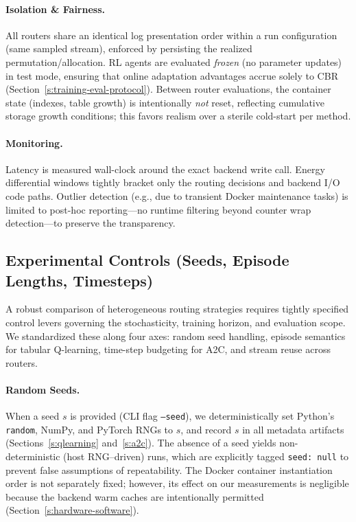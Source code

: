 \paragraph{Isolation \& Fairness.} All routers share an identical log presentation order within a run configuration (same sampled stream), enforced by persisting the realized permutation/allocation. RL agents are evaluated \emph{frozen} (no parameter updates) in test mode, ensuring that online adaptation advantages accrue solely to CBR (Section~\ref{s:training-eval-protocol}). Between router evaluations, the container state (indexes, table growth) is intentionally \emph{not} reset, reflecting cumulative storage growth conditions; this favors realism over a sterile cold-start per method.

\paragraph{Monitoring.} Latency is measured wall-clock around the exact backend write call. Energy differential windows tightly bracket only the routing decisions and backend I/O code paths. Outlier detection (e.g., due to transient Docker maintenance tasks) is limited to post-hoc reporting—no runtime filtering beyond counter wrap detection—to preserve the transparency.



\subsection{Experimental Controls (Seeds, Episode Lengths, Timesteps)}
\label{s:experimental-controls}

A robust comparison of heterogeneous routing strategies requires tightly specified control levers governing the stochasticity, training horizon, and evaluation scope. We standardized these along four axes: random seed handling, episode semantics for tabular Q-learning, time-step budgeting for A2C, and stream reuse across routers.

\paragraph{Random Seeds.} When a seed $s$ is provided (CLI flag \texttt{--seed}), we deterministically set Python's \texttt{random}, NumPy, and PyTorch RNGs to $s$, and record $s$ in all metadata artifacts (Sections~\ref{s:qlearning} and~\ref{s:a2c}). The absence of a seed yields non-deterministic (host RNG–driven) runs, which are explicitly tagged \texttt{seed: null} to prevent false assumptions of repeatability. The Docker container instantiation order is not separately fixed; however, its effect on our measurements is negligible because the backend warm caches are intentionally permitted (Section~\ref{s:hardware-software}).

